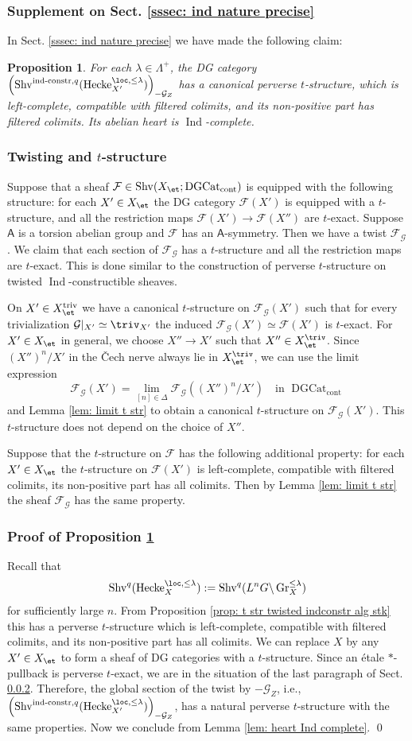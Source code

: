 \documentclass[10pt]{amsart}
\newcommand{\sssec}{\subsubsection}
\newtheorem{prop}[subsubsection]{Proposition}
\theoremstyle{remark}
\newcommand{\te}{\text}
\newcommand{\on}{\operatorname}
\newcommand{\cF}{\mathcal{F}}
\newcommand{\cG}{\mathcal{G}}
\newcommand{\DGcat}{\on{DGCat}_{\on{cont}}}
\newcommand{\Shv}{\on{Shv}}
\DeclareMathOperator{\Ind}{Ind}
\newcommand{\Gr}{\on{Gr}}
\newcommand{\Hecke}{\on{Hecke}}
\newcommand{\sfA}{\mathsf{A}}
\begin{document}
\sssec{Supplement on Sect. \ref{sssec: ind nature precise}}
In Sect. \ref{sssec: ind nature precise} we have made the following claim:

\begin{prop}\label{prop: t str on untwisted indconstr Hecke loc}
    For each $\lambda\in\Lambda^+$, the DG category $\left(\Shv^{\on{ind-constr},q}(\Hecke^{\loc,\le\lambda}_{X'})\right)_{-\cG_Z}$ has a canonical perverse $t$-structure, which is left-complete, compatible with filtered colimits, and its non-positive part has filtered colimits. Its abelian heart is $\Ind$-complete.
\end{prop}

\sssec{Twisting and $t$-structure}\label{sssec: twisting and t str}
Suppose that a sheaf $\cF\in\Shv(X_{\et};\DGcat)$ is equipped with the following structure: for each $X'\in X_{\et}$ the DG category $\cF(X')$ is equipped with a $t$-structure, and all the restriction maps $\cF(X')\rightarrow \cF(X'')$ are $t$-exact. Suppose $\sfA$ is a torsion abelian group and $\cF$ has an $\sfA$-symmetry. Then we have a twist $\cF_{\cG}$. We claim that each section of $\cF_{\cG}$ has a $t$-structure and all the restriction maps are $t$-exact. This is done similar to the construction of perverse $t$-structure on twisted $\Ind$-constructible sheaves.
\medskip

On $X'\in X^{\on{triv}}_{\et}$ we have a canonical $t$-structure on $\cF_{\cG}(X')$ such that for every trivialization $\cG|_{X'}\simeq \triv_{X'}$ the induced $\cF_{\cG}(X')\simeq \cF(X')$ is $t$-exact. For $X'\in X_{\et}$ in general, we choose $X''\rightarrow X'$ such that $X''\in X^{\triv}_{\et}$. Since $(X'')^n/X'$ in the \v{C}ech nerve always lie in $X^{\triv}_{
\et}$, we can use the limit expression
\[\cF_{\cG}(X')=\lim_{[n]\in\Delta}\cF_{\cG}((X'')^n/X') \quad \te{in }\DGcat\]
and Lemma \ref{lem: limit t str} to obtain a canonical $t$-structure on $\cF_{\cG}(X')$. This $t$-structure does not depend on the choice of $X''$. 
\medskip

Suppose that the $t$-structure on $\cF$ has the following additional property: for each $X'\in X_{\et}$ the $t$-structure on $\cF(X')$ is left-complete, compatible with filtered colimits, its non-positive part has all colimits. Then by Lemma \ref{lem: limit t str} the sheaf $\cF_{\cG}$ has the same property.

\sssec{Proof of Proposition \ref{prop: t str on untwisted indconstr Hecke loc}}
Recall that 
\[\Shv^q(\Hecke^{\loc,\le\lambda}_{X}):=\Shv^q(L^{n}G\backslash \Gr^{\le\lambda}_X)\]
for sufficiently large $n$. From Proposition \ref{prop: t str twisted indconstr alg stk} this has a perverse $t$-structure which is left-complete, compatible with filtered colimits, and its non-positive part has all colimits. We can replace $X$ by any $X'\in X_{\et}$ to form a sheaf of DG categories with a $t$-structure. Since an \'etale $*$-pullback is perverse $t$-exact, we are in the situation of the last paragraph of Sect. \ref{sssec: twisting and t str}. Therefore, the global section of the twist by $-\cG_Z$, i.e., $\left(\Shv^{\on{ind-constr},q}(\Hecke^{\loc,\le\lambda}_{X'})\right)_{-\cG_Z}$, has a natural perverse $t$-structure with the same properties. Now we conclude from Lemma \ref{lem: heart Ind complete}. \qed
\end{document}
